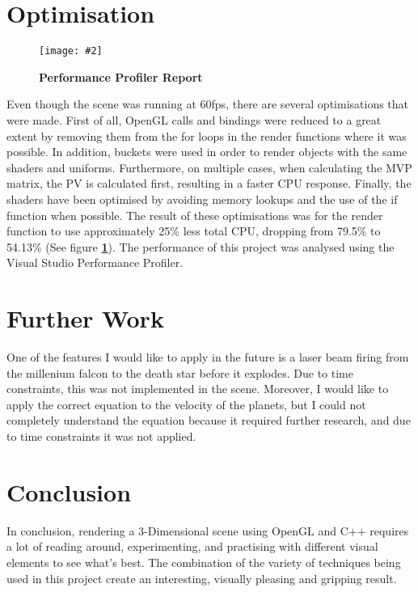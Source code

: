 \documentclass[10pt, a4paper]{article}
\newcommand{\figuremacro}[5]{
    \begin{figure}[#1]
        \centering
        \texttt{[image: \#2]}
        \caption[#3]{\textbf{#3}#4}
        \label{fig:#2}
    \end{figure}
}
\begin{document}
\section{Optimisation}

	\figuremacro{H}{Optimisation}{Performance Profiler Report}{ }{1.0}
	
	Even though the scene was running at 60fps, there are several optimisations that were made. First of all, OpenGL calls and bindings were reduced to a great extent by removing them from the for loops in the render functions where it was possible. In addition, buckets were used in order to render objects with the same shaders and uniforms. Furthermore, on multiple cases, when calculating the MVP matrix, the PV is calculated first, resulting in a faster CPU response. Finally, the shaders have been optimised by avoiding memory lookups and the use of the if function when possible.
	The result of these optimisations was for the render function to use approximately 25\% less total CPU, dropping from 79.5\% to 54.13\% (See figure \textbf{\ref{fig:Optimisation}}). The performance of this project was analysed using the Visual Studio Performance Profiler.
	
	
	 
\section{Further Work}	 
	
	One of the features I would like to apply in the future is a laser beam firing from the millenium falcon to the death star before it explodes. Due to time constraints, this was not implemented in the scene. Moreover, I would like to apply the correct equation to the velocity of the planets, but I could not completely understand the equation because it required further research, and due to time constraints it was not applied. 
	
	
\section{Conclusion}	

	In conclusion, rendering a 3-Dimensional scene using OpenGL and C++ requires a lot of reading around, experimenting, and practising with different visual elements to see what's best. The combination of the variety of techniques being used in this project create an interesting, visually pleasing and gripping result.
	
	




		
\end{document}
